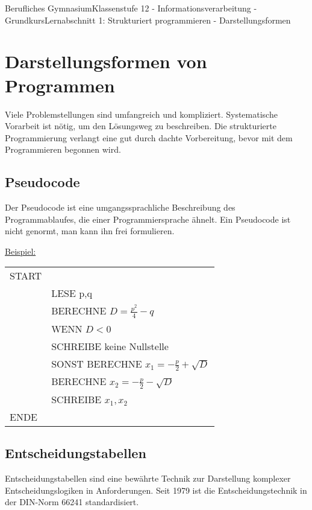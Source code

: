 \documentclass[11pt,oneside,openany,headings=optiontotoc,11pt,numbers=noenddot]{article}
\begin{document}
	\begin{worksheet}{Berufliches Gymnasium}{Klassenstufe 12 - Informationsverarbeitung - Grundkurs}{Lernabschnitt 1: Strukturiert programmieren - Darstellungsformen}
		\setlength{\columnseprule}{0pt}
		\setcounter{section}{2}
		\setcounter{page}{6}
		\noindent
		\section{Darstellungsformen von Programmen}
		Viele Problemstellungen sind umfangreich und kompliziert. Systematische Vorarbeit ist nötig, um den Lösungsweg zu beschreiben. Die strukturierte Programmierung verlangt eine gut durch dachte Vorbereitung, bevor mit dem Programmieren begonnen wird.
		\subsection{Pseudocode}
		Der Pseudocode ist eine umgangssprachliche Beschreibung des Programmablaufes, die einer Programmiersprache ähnelt. Ein Pseudocode ist nicht genormt, man kann ihn frei formulieren.
		\begin{framed}
			\noindent
			\underline{Beispiel:}\\
			\begin{itshape}
				\begin{tabularx}{\textwidth}{lX}
					START\\
					& LESE p,q\\
					& BERECHNE \(D = \frac{p^2}{4} - q\)\\
					& WENN \(D < 0\)\\
					& SCHREIBE \grqq{}keine Nullstelle\grqq{}\\
					& SONST BERECHNE \(x_1 = -\frac{p}{2} + \sqrt{D}\)\\
					& BERECHNE \(x_2 = -\frac{p}{2} - \sqrt{D}\)\\
					& SCHREIBE \(x_1, x_2\)\\
					ENDE
				\end{tabularx}
			\end{itshape}
		\end{framed}
		\subsection{Entscheidungstabellen}
		Entscheidungstabellen sind eine bewährte Technik zur Darstellung komplexer Entscheidungslogiken in Anforderungen. Seit 1979 ist die Entscheidungstechnik in der DIN-Norm 66241 standardisiert.

\end{worksheet}
\end{document}
